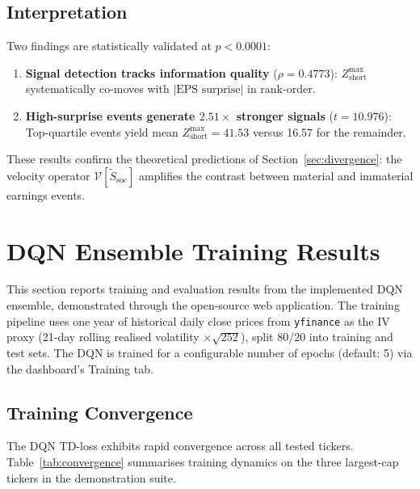 \documentclass[10pt,twocolumn]{article}
\newcommand{\Zshort}{Z_{\mathrm{short}}}
\newcommand{\Vop}{\mathcal{V}}
\newcommand{\Stilde}{\tilde{S}}
\begin{document}
\subsection{Interpretation}

Two findings are statistically validated at $p<0.0001$:
\begin{enumerate}[leftmargin=*,topsep=2pt,itemsep=1pt]
  \item \textbf{Signal detection tracks information quality}
    ($\rho=0.4773$): $\Zshort^{\max}$ systematically co-moves with
    $|\text{EPS surprise}|$ in rank-order.
  \item \textbf{High-surprise events generate $2.51\times$ stronger signals}
    ($t=10.976$): Top-quartile events yield mean $\Zshort^{\max}=41.53$
    versus 16.57 for the remainder.
\end{enumerate}

These results confirm the theoretical predictions of Section~\ref{sec:divergence}:
the velocity operator $\Vop[\Stilde_{\mathrm{soc}}]$ amplifies the contrast
between material and immaterial earnings events.

\section{DQN Ensemble Training Results}
\label{sec:dqn_results}

This section reports training and evaluation results from the implemented DQN
ensemble, demonstrated through the open-source web application. The training
pipeline uses one year of historical daily close prices from \texttt{yfinance}
as the IV proxy (21-day rolling realised volatility $\times\sqrt{252}$), split
80/20 into training and test sets. The DQN is trained for a configurable
number of epochs (default: 5) via the dashboard's Training tab.

\subsection{Training Convergence}

The DQN TD-loss exhibits rapid convergence across all tested tickers.
Table~\ref{tab:convergence} summarises training dynamics on the three
largest-cap tickers in the demonstration suite.

\begin{table}[htbp]
\centering
\caption{DQN Training Convergence — TD-Loss by Epoch}
\label{tab:convergence}
\end{table}
\end{document}

